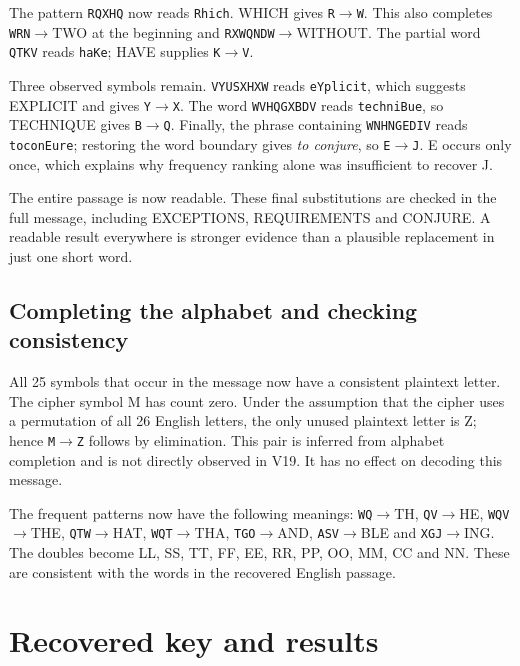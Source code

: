\documentclass{tum_report}
\newcommand{\partialtext}[1]{{\setstretch{1}}}
\newcommand{\pair}[2]{\texttt{#1}$\to$\texttt{#2}}
\begin{document}
The pattern \texttt{RQXHQ} now reads \texttt{Rhich}. WHICH gives
\pair{R}{W}. This also completes \texttt{WRN}$\to$TWO at the beginning
and \texttt{RXWQNDW}$\to$WITHOUT. The partial word
\texttt{QTKV} reads \texttt{haKe}; HAVE supplies \pair{K}{V}.
\partialtext{22}

Three observed symbols remain. \texttt{VYUSXHXW} reads \texttt{eYplicit},
which suggests EXPLICIT and gives \pair{Y}{X}. The word
\texttt{WVHQGXBDV} reads \texttt{techniBue}, so TECHNIQUE gives
\pair{B}{Q}. Finally, the phrase containing \texttt{WNHNGEDIV}
reads \texttt{toconEure}; restoring the word boundary gives
\textit{to conjure}, so \pair{E}{J}. E occurs only once, which explains
why frequency ranking alone was insufficient to recover J.
\partialtext{25}

The entire passage is now readable. These final substitutions are checked
in the full message, including EXCEPTIONS, REQUIREMENTS and CONJURE.
A readable result everywhere is stronger evidence than a plausible
replacement in just one short word.

\section{Completing the alphabet and checking consistency}
All 25 symbols that occur in the message now have a consistent plaintext
letter. The cipher symbol M has count zero. Under the assumption that the
cipher uses a permutation of all 26 English letters, the only unused
plaintext letter is Z; hence \pair{M}{Z} follows by elimination. This pair
is inferred from alphabet completion and is not directly observed in V19.
It has no effect on decoding this message.

The frequent patterns now have the following meanings:
\texttt{WQ}$\to$TH, \texttt{QV}$\to$HE, \texttt{WQV}$\to$THE,
\texttt{QTW}$\to$HAT, \texttt{WQT}$\to$THA, \texttt{TGO}$\to$AND,
\texttt{ASV}$\to$BLE and \texttt{XGJ}$\to$ING.
The doubles become LL, SS, TT, FF, EE, RR, PP, OO, MM, CC and NN.
These are consistent with the words in the recovered English passage.

\clearpage
\chapter{Recovered key and results}
\end{document}
